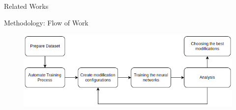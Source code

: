 \documentclass[final,hyperref={pdfpagelabels=false}]{beamer}
\begin{document}
\begin{frame}[t]
\begin{columns}[t]
\begin{column}{.465\textwidth}
\begin{block}{Related Works}
\end{block}

\begin{block}{Methodology: Flow of Work}

\begin{figure}
\includegraphics[width=\linewidth]{metodologi.png}
\end{figure}

\end{block}




\end{column}
\end{columns}
\end{frame}
\end{document}
